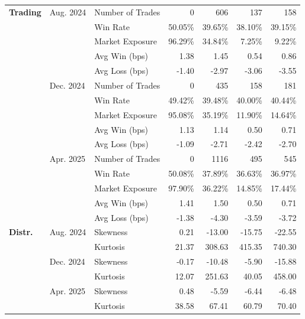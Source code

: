 \begin{table}[H]
{\begin{tabular*}{\textwidth}{@{\extracolsep{\fill}} l l l r r r r}
\textbf{Trading}
& Aug. 2024 & Number of Trades          & 0         & 606        & 137        & 158 \\
&           & Win Rate                  & 50.05\%   & 39.65\%    & 38.10\%    & 39.15\% \\
&           & Market Exposure           & 96.29\%   & 34.84\%    & 7.25\%     & 9.22\% \\
&           & Avg Win (bps)             & 1.38      & 1.45       & 0.54       & 0.86 \\
&           & Avg Loss (bps)            & -1.40     & -2.97      & -3.06      & -3.55 \\
& Dec. 2024 & Number of Trades          & 0        & 435        & 158        & 181 \\
&           & Win Rate                  & 49.42\%  & 39.48\%    & 40.00\%    & 40.44\% \\
&           & Market Exposure           & 95.08\%  & 35.19\%    & 11.90\%    & 14.64\% \\
&           & Avg Win (bps)             & 1.13     & 1.14       & 0.50       & 0.71 \\
&           & Avg Loss (bps)            & -1.09    & -2.71      & -2.42      & -2.70 \\
& Apr. 2025 & Number of Trades          & 0        & 1116        & 495         & 545 \\
&           & Win Rate                  & 50.08\%  & 37.89\%     & 36.63\%     & 36.97\% \\
&           & Market Exposure           & 97.90\%  & 36.22\%     & 14.85\%     & 17.44\% \\
&           & Avg Win (bps)             & 1.41     & 1.50        & 0.50        & 0.71 \\
&           & Avg Loss (bps)            & -1.38    & -4.30       & -3.59       & -3.72 \\
\midrule

\textbf{Distr.}
& Aug. 2024 & Skewness                  & 0.21      & -13.00     & -15.75     & -22.55 \\
&           & Kurtosis                  & 21.37     & 308.63     & 415.35     & 740.30 \\
& Dec. 2024 & Skewness                  & -0.17    & -10.48     & -5.90      & -15.88 \\
&           & Kurtosis                  & 12.07    & 251.63     & 40.05      & 458.00 \\
& Apr. 2025 & Skewness                  & 0.48     & -5.59       & -6.44       & -6.48 \\
&           & Kurtosis                  & 38.58    & 67.41       & 60.79       & 70.40 \\


\end{tabular*}}
\end{table}
